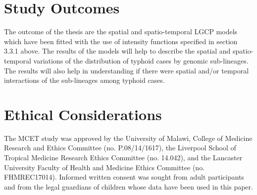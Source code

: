 \section{Study Outcomes}

The outcome of the thesis are the spatial and spatio-temporal LGCP models which have been fitted with the use of intensity functions specified in section 3.3.1 above. The results of the models will help to describe the spatial and spatio-temporal variations of the distribution of typhoid cases by genomic sub-lineages. The results will also help in understanding if there were spatial and/or temporal interactions of the sub-lineages among typhoid cases.

\section{Ethical Considerations}

The MCET study was approved by the University of Malawi, College of Medicine Research and Ethics Committee (no. P.08/14/1617), the Liverpool School of Tropical Medicine Research Ethics Committee (no. 14.042), and the Lancaster University Faculty of Health and Medicine Ethics Committee (no. FHMREC17014). Informed written consent was sought from adult participants and from the legal guardians of children whose data have been used in this paper.
